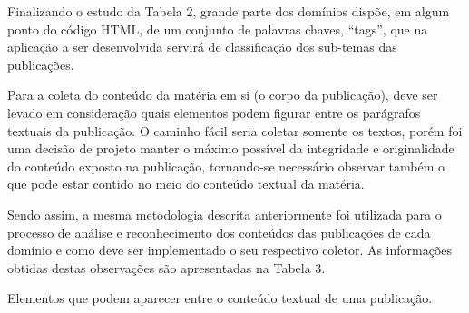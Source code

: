 Finalizando o estudo da Tabela 2, grande parte dos domínios dispõe, em algum ponto do código HTML, de um conjunto de palavras chaves, “tags”, que na aplicação a ser desenvolvida servirá de classificação dos sub-temas das publicações.

Para a coleta do conteúdo da matéria em si (o corpo da publicação), deve ser levado em consideração quais elementos podem figurar entre os parágrafos textuais da publicação. O caminho fácil seria coletar somente os textos, porém foi uma decisão de projeto manter o máximo possível da integridade e originalidade do conteúdo exposto na publicação, tornando-se necessário observar também o que pode estar contido no meio do conteúdo textual da matéria. 

Sendo assim, a mesma metodologia descrita anteriormente foi utilizada para o processo de análise e reconhecimento dos conteúdos das publicações de cada domínio e como deve ser implementado o seu respectivo coletor. As informações obtidas destas observações são apresentadas na Tabela 3.  

\begin{table}[H]

\noindent\makebox[\textwidth]{%
}
\caption{Elementos que podem aparecer entre o conteúdo textual de uma publicação.}
\end{table}







